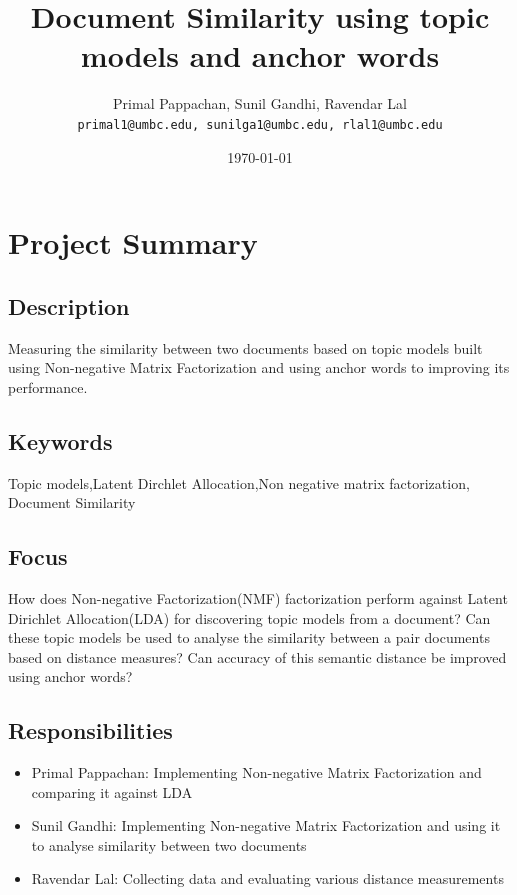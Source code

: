 \documentclass[a4paper,11pt]{article}
\begin{document}

\title{Document Similarity using topic models and anchor words}
\author{Primal Pappachan, Sunil Gandhi, Ravendar Lal \\ 
\texttt{primal1@umbc.edu, sunilga1@umbc.edu, rlal1@umbc.edu}}
\date{\today}
\maketitle


\section{Project Summary}
\subsection{Description}
Measuring the similarity between two documents based on topic models built using Non-negative Matrix Factorization and using anchor words to improving its performance.
\subsection{Keywords}
Topic models,Latent Dirchlet Allocation,Non negative matrix factorization, Document Similarity 
\subsection{Focus}
How does Non-negative Factorization(NMF) factorization perform against Latent Dirichlet Allocation(LDA) for discovering topic models from a document? Can these topic models be used to analyse the similarity between a pair documents based on distance measures? Can accuracy of this semantic distance be improved using anchor words?

\subsection{Responsibilities}
\begin{itemize}
\item Primal Pappachan: Implementing Non-negative Matrix Factorization and comparing it against LDA
\item Sunil Gandhi: Implementing Non-negative Matrix Factorization and using it to analyse similarity between two documents 
\item Ravendar Lal: Collecting data and evaluating various distance measurements
\end{itemize}
\end{document}

